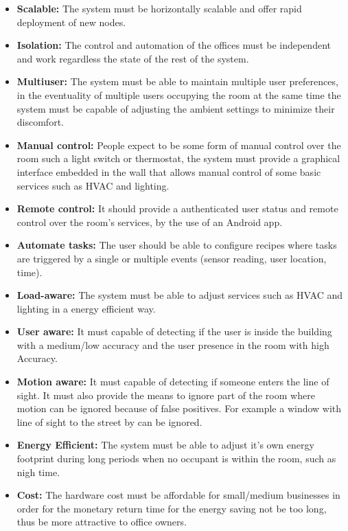 \begin{itemize}
  \item \textbf{Scalable:} The system must be horizontally scalable and offer rapid deployment of new nodes.
  
  \item \textbf{Isolation:} The control and automation of the offices must be independent and work regardless the state of the rest of the system.
  
  \item \textbf{Multiuser:} The system must be able to maintain multiple user preferences, in the eventuality of multiple users occupying the room at the same time the system must be capable of adjusting the ambient settings to minimize their discomfort. 
  
  \item \textbf{Manual control:} People expect to be some form of manual control over the room such a light switch or thermostat, the system must provide a graphical interface embedded in the wall that allows manual control of some basic services such as HVAC and lighting.
  
  \item \textbf{Remote control:} It should provide a authenticated user status and remote control over the room's services, by the use of an Android app.
  
  \item \textbf{Automate tasks:} The user should be able to configure recipes where tasks are triggered by a single or multiple events (sensor reading, user location, time).
  
  \item \textbf{Load-aware:} The system must be able to adjust services such as HVAC and lighting in a energy efficient way.
  
  \item \textbf{User aware:} It must capable of detecting if the user is inside the building with a medium/low accuracy and the user presence in the room with high Accuracy.
  
  \item \textbf{Motion aware:} It must capable of detecting if someone enters the line of sight. It must also provide the means to ignore part of the room where motion can be ignored because of false positives. For example a window with line of sight to the street by can be ignored.
  
  \item \textbf{Energy Efficient:} The system must be able to adjust it's own energy footprint during long periods when no occupant is within the room, such as nigh time.  
  
  \item \textbf{Cost:} The hardware cost must be affordable for small/medium businesses in order for the monetary return time for the energy saving not be too long, thus be more attractive to office owners.
  
\end{itemize}





